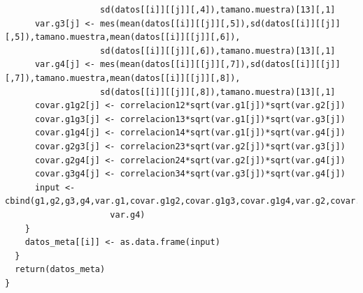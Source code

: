 \documentclass[a4paper,openright,12pt]{report}
\begin{document}
{\begin{verbatim}
                   sd(datos[[i]][[j]][,4]),tamano.muestra)[13][,1]
      var.g3[j] <- mes(mean(datos[[i]][[j]][,5]),sd(datos[[i]][[j]][,5]),tamano.muestra,mean(datos[[i]][[j]][,6]),
                   sd(datos[[i]][[j]][,6]),tamano.muestra)[13][,1]
      var.g4[j] <- mes(mean(datos[[i]][[j]][,7]),sd(datos[[i]][[j]][,7]),tamano.muestra,mean(datos[[i]][[j]][,8]),
                   sd(datos[[i]][[j]][,8]),tamano.muestra)[13][,1]
      covar.g1g2[j] <- correlacion12*sqrt(var.g1[j])*sqrt(var.g2[j])
      covar.g1g3[j] <- correlacion13*sqrt(var.g1[j])*sqrt(var.g3[j])
      covar.g1g4[j] <- correlacion14*sqrt(var.g1[j])*sqrt(var.g4[j])
      covar.g2g3[j] <- correlacion23*sqrt(var.g2[j])*sqrt(var.g3[j])
      covar.g2g4[j] <- correlacion24*sqrt(var.g2[j])*sqrt(var.g4[j])
      covar.g3g4[j] <- correlacion34*sqrt(var.g3[j])*sqrt(var.g4[j])
      input <- cbind(g1,g2,g3,g4,var.g1,covar.g1g2,covar.g1g3,covar.g1g4,var.g2,covar.g2g3,covar.g2g4,var.g3,covar.g3g4,
                     var.g4)
    }
    datos_meta[[i]] <- as.data.frame(input)
  }
  return(datos_meta)
}
\end{verbatim}}
\end{document}
